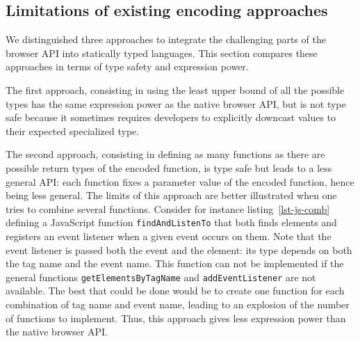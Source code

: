 \documentclass{llncs}
\newcommand{\jscode}[1]{\lstinline[language=JavaScript]|#1|}
\begin{document}
% 

\subsection{Limitations of existing encoding approaches}
\label{sec-limitations}

We distinguished three approaches to integrate the challenging parts of the browser API into statically typed languages. This section compares these approaches in terms of type safety and expression power.

The first approach, consisting in using the least upper bound of all the possible types has the same expression power as the native browser API, but is not type safe because it sometimes requires developers to explicitly downcast values to their expected specialized type.

The second approach, consisting in defining as many functions as there are possible return types of the encoded function, is type safe but leads to a less general API: each function fixes a parameter value of the encoded function, hence being less general. The limits of this approach are better illustrated when one tries to combine several functions. Consider for instance listing~\ref{lst-js-comb} defining a JavaScript function \jscode{findAndListenTo} that both finds elements and registers an event listener when a given event occurs on them. Note that the event listener is passed both the event and the element: its type depends on both the tag name and the event name. This function can not be implemented if the general functions \jscode{getElementsByTagName} and \jscode{addEventListener} are not available. The best that could be done would be to create one function for each combination of tag name and event name, leading to an explosion of the number of functions to implement. Thus, this approach gives less 
expression power than the native browser API.
\end{document}
